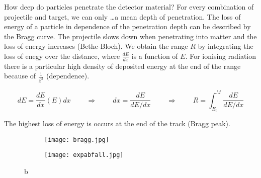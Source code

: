 How deep do particles penetrate the detector material? For every combination of projectile and
target, we can only \ldots a mean depth of penetration. The loss of energy of a particle in
dependence of the penetration depth can be described by the Bragg curve. The projectile slows down
when penetrating into matter and the loss of energy increases (Bethe-Bloch). We obtain the range $R$
by integrating  the loss of enegy over the distance, where $\frac{dE}{dx}$ is a function of $E$. For
ionising radiation there is a particular high density of deposited energy  at the end of the range
because of $\frac{1}{\beta^2}$ (dependence).

\[dE= \frac{dE}{dx}(E)dx~~~~~~~~~~\Rightarrow~~~~~~~~~~dx
=\frac{dE}{dE/dx}~~~~~~~~~~\Rightarrow~~~~~~~~~~ R=\int_{E_c}^{M} \frac{dE}{dE/dx}  \]

The highest loss of energy is occurs at the end of the track (Bragg peak).

\begin{figure}[htbp]
	\begin{minipage}[b]{0.5\textwidth}
		\begin{figure}[H]
		\centering
		\texttt{[image: bragg.jpg]}
		\end{figure}
	\end{minipage}
	\hfill
	\begin{minipage}[b]{0.5\textwidth}
		\begin{figure}[H]
		\centering
		\texttt{[image: expabfall.jpg]}
		\end{figure}
	\end{minipage}
	\caption{b}
	\label{rekristall} 
\end{figure}